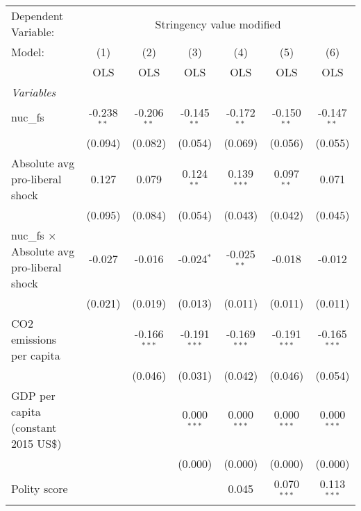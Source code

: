 
\begingroup
\centering
\begin{tabular}{lcccccc}
   \toprule
   Dependent Variable: & \multicolumn{6}{c}{Stringency value modified}\\
   Model:                                            & (1)           & (2)            & (3)            & (4)            & (5)            & (6)\\  
                                                     &  OLS          & OLS            & OLS            & OLS            & OLS            & OLS\\  
   \midrule
   \emph{Variables}\\
   nuc\_fs                                           & -0.238$^{**}$ & -0.206$^{**}$  & -0.145$^{**}$  & -0.172$^{**}$  & -0.150$^{**}$  & -0.147$^{**}$\\   
                                                     & (0.094)       & (0.082)        & (0.054)        & (0.069)        & (0.056)        & (0.055)\\   
   Absolute avg pro-liberal shock                    & 0.127         & 0.079          & 0.124$^{**}$   & 0.139$^{***}$  & 0.097$^{**}$   & 0.071\\   
                                                     & (0.095)       & (0.084)        & (0.054)        & (0.043)        & (0.042)        & (0.045)\\   
   nuc\_fs $\times$ Absolute avg pro-liberal shock   & -0.027        & -0.016         & -0.024$^{*}$   & -0.025$^{**}$  & -0.018         & -0.012\\   
                                                     & (0.021)       & (0.019)        & (0.013)        & (0.011)        & (0.011)        & (0.011)\\   
   CO2 emissions per capita                          &               & -0.166$^{***}$ & -0.191$^{***}$ & -0.169$^{***}$ & -0.191$^{***}$ & -0.165$^{***}$\\   
                                                     &               & (0.046)        & (0.031)        & (0.042)        & (0.046)        & (0.054)\\   
   GDP per capita (constant 2015 US\$)               &               &                & 0.000$^{***}$  & 0.000$^{***}$  & 0.000$^{***}$  & 0.000$^{***}$\\   
                                                     &               &                & (0.000)        & (0.000)        & (0.000)        & (0.000)\\   
   Polity score                                      &               &                &                & 0.045          & 0.070$^{***}$  & 0.113$^{***}$\\   

\end{tabular}
